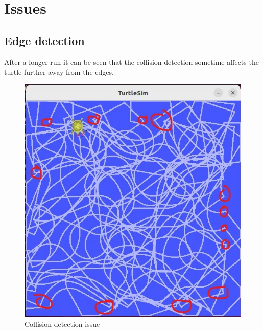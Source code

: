 \section{Issues} \label{sec:issues}
\subsection{Edge detection}
After a longer run it can be seen that the collision detection sometime affects the turtle further away from the edges. 
\begin{figure}[H]
    \centering
    \includegraphics[width=0.8\linewidth]{document//Figure/07appl.jpg}
    \caption{Collision detection issue}
\end{figure}